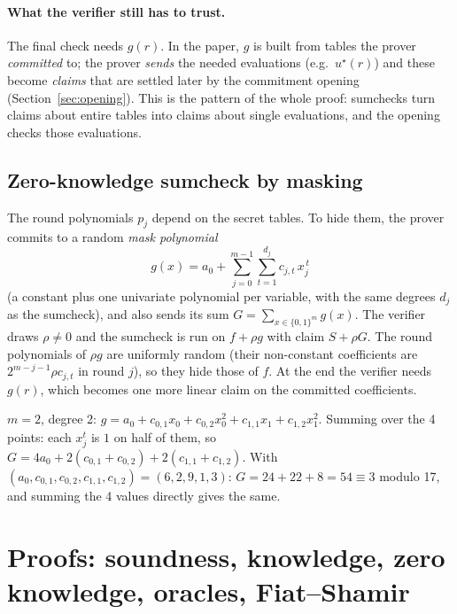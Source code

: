 \documentclass[11pt,a4paper]{article}
\newcommand{\cube}[1]{\{0,1\}^{#1}}
\newcommand{\msk}[1]{#1^{\star}}
\theoremstyle{definition}
\theoremstyle{plain}
\begin{document}
\paragraph{What the verifier still has to trust.} The final check needs $g(r)$. In the paper, $g$
is built from tables the prover \emph{committed} to; the prover \emph{sends} the needed evaluations
(e.g.\ $\msk u(r)$) and these become \emph{claims} that are settled later by the commitment opening
(Section~\ref{sec:opening}). This is the pattern of the whole proof: sumchecks turn claims about
entire tables into claims about single evaluations, and the opening checks those evaluations.

\subsection{Zero-knowledge sumcheck by masking}
\label{sec:zksumcheck}

The round polynomials $p_j$ depend on the secret tables. To hide them, the prover commits to a
random \emph{mask polynomial}
\[
  g(x)=a_0+\sum_{j=0}^{m-1}\sum_{t=1}^{d_j}c_{j,t}\,x_j^{\,t}
\]
(a constant plus one univariate polynomial per variable, with the same degrees $d_j$ as the sumcheck),
and also sends its sum $G=\sum_{x\in\cube m}g(x)$. The verifier draws $\rho\neq 0$ and the sumcheck is
run on $f+\rho g$ with claim $S+\rho G$. The round polynomials of $\rho g$ are uniformly random
(their non-constant coefficients are $2^{m-j-1}\rho c_{j,t}$ in round $j$), so they hide those of $f$.
At the end the verifier needs $g(r)$, which becomes one more linear claim on the committed
coefficients.

\begin{example}
$m=2$, degree 2: $g=a_0+c_{0,1}x_0+c_{0,2}x_0^2+c_{1,1}x_1+c_{1,2}x_1^2$. Summing over the 4 points:
each $x_j^t$ is $1$ on half of them, so $G=4a_0+2(c_{0,1}+c_{0,2})+2(c_{1,1}+c_{1,2})$. With
$(a_0,c_{0,1},c_{0,2},c_{1,1},c_{1,2})=(6,2,9,1,3)$: $G=24+22+8=54\equiv 3$ modulo 17, and summing
the 4 values directly gives the same.
\end{example}

\section{Proofs: soundness, knowledge, zero knowledge, oracles, Fiat--Shamir}
\label{sec:proofs}
\end{document}
